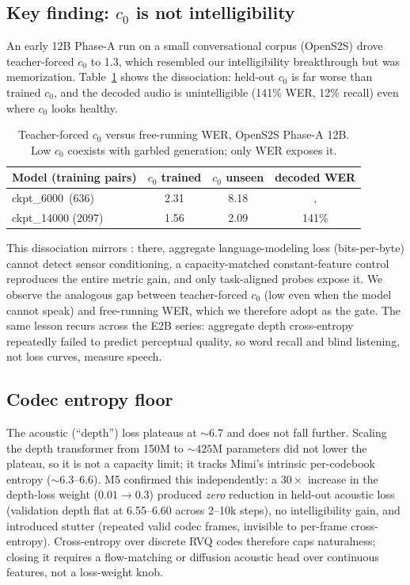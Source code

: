 \documentclass[11pt]{article}
\begin{document}
\subsection{Key finding: $c_0$ is not intelligibility}
\label{sec:findings}
An early 12B Phase-A run on a small conversational corpus (OpenS2S) drove
teacher-forced $c_0$ to 1.3, which resembled our intelligibility breakthrough but
was memorization. Table~\ref{tab:c0wer} shows the dissociation: held-out $c_0$ is
far worse than trained $c_0$, and the decoded audio is unintelligible (141\% WER,
12\% recall) even where $c_0$ looks healthy.

\begin{table}[tbp]\centering
\caption{Teacher-forced $c_0$ versus free-running WER, OpenS2S Phase-A 12B.
Low $c_0$ coexists with garbled generation; only WER exposes it.}
\label{tab:c0wer}
\begin{tabular}{lccc}\toprule
 Model (training pairs) & $c_0$ trained & $c_0$ unseen & decoded WER \\ \midrule
 ckpt\_6000 \,(636)   & 2.31 & 8.18 &, \\
 ckpt\_14000 (2097)   & 1.56 & 2.09 & 141\% \\ \bottomrule
\end{tabular}
\end{table}

This dissociation mirrors \citet{penov2026loraBridges}: there, aggregate
language-modeling loss (bits-per-byte) cannot detect sensor conditioning, a
capacity-matched constant-feature control reproduces the entire metric gain, and
only task-aligned probes expose it. We observe the analogous gap between
teacher-forced $c_0$ (low even when the model cannot speak) and free-running WER,
which we therefore adopt as the gate. The same lesson recurs across the E2B
series: aggregate depth cross-entropy repeatedly failed to predict perceptual
quality, so word recall and blind listening, not loss curves, measure speech.

\subsection{Codec entropy floor}
\label{sec:codecfloor}
The acoustic (``depth'') loss plateaus at ${\sim}6.7$ and does not fall further.
Scaling the depth transformer from 150M to ${\sim}425$M parameters did not lower
the plateau, so it is not a capacity limit; it tracks Mimi's intrinsic
per-codebook entropy (${\sim}6.3$--$6.6$). M5 confirmed this independently: a
$30\times$ increase in the depth-loss weight ($0.01\to0.3$) produced \emph{zero}
reduction in held-out acoustic loss (validation depth flat at 6.55--6.60 across
2--10k steps), no intelligibility gain, and introduced stutter (repeated valid
codec frames, invisible to per-frame cross-entropy). Cross-entropy over discrete
RVQ codes therefore caps naturalness; closing it requires a flow-matching or
diffusion acoustic head over continuous features, not a loss-weight knob.
\end{document}
